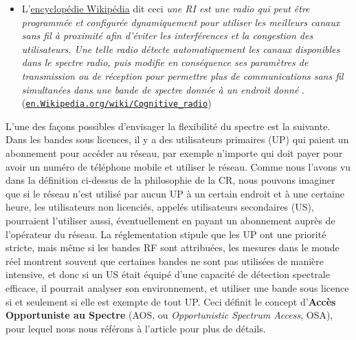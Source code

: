 \begin{resume_fr}
\begin{itemize}
    \item
    L'\href{https://en.wikipedia.org/wiki/Cognitive_radio}{encyclopédie Wikipédia} dit ceci
    \guillemotleft{} \emph{une RI est une radio qui peut être programmée et configurée dynamiquement pour utiliser les meilleurs canaux sans fil à proximité afin d'éviter les interférences et la congestion des utilisateurs. Une telle radio détecte automatiquement les canaux disponibles dans le spectre radio, puis modifie en conséquence ses paramètres de transmission ou de réception pour permettre plus de communications sans fil simultanées dans une bande de spectre donnée à un endroit donné} \guillemotright{}.
    (\href{https://en.wikipedia.org/wiki/Cognitive_radio}{\texttt{en.Wikipedia.org/wiki/Cognitive\_radio}})
\end{itemize}

L'une des façons possibles d'envisager la flexibilité du spectre est la suivante.
%
Dans les bandes sous licences, il y a des utilisateurs primaires (UP) qui paient un abonnement pour accéder au réseau, par exemple n'importe qui doit payer pour avoir un numéro de téléphone mobile et utiliser le réseau.
Comme nous l'avons vu dans la définition ci-dessus de la philosophie de la CR, nous pouvons imaginer que si le réseau n'est utilisé par aucun UP à un certain endroit et à une certaine heure, les utilisateurs non licenciés, appelés utilisateurs secondaires (US), pourraient l'utiliser aussi, éventuellement en payant un abonnement auprès de l'opérateur du réseau.
%
La réglementation stipule que les UP ont une priorité stricte,
mais même si les bandes RF sont attribuées, les mesures dans le monde réel montrent souvent que certaines bandes ne sont pas utilisées de manière intensive, et donc si un US était équipé d'une capacité de détection spectrale efficace, il pourrait analyser son environnement, et utiliser une bande sous licence si et seulement si elle est exempte de tout UP.
Ceci définit le concept d'\textbf{Accès Opportuniste au Spectre} (AOS, ou \emph{Opportunistic Spectrum Access}, OSA), pour lequel nous nous référons à l'article \cite{Zhao07} pour plus de détails.



\end{resume_fr}
